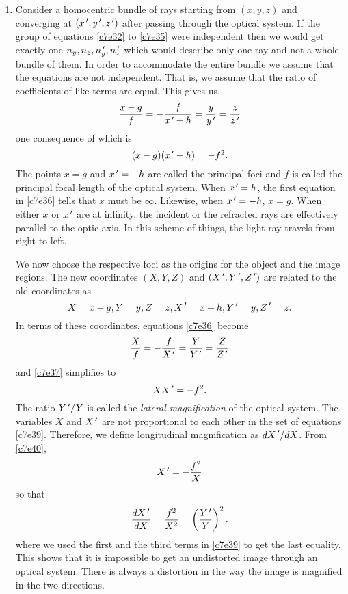 \begin{enumerate}
\item Consider a homocentric bundle of rays starting from $(x, y, z)$ and
converging at $(x^{\,\prime}, y^{\,\prime}, z^{\,\prime})$ after passing through the optical system.
If the group of equations \eqref{c7e32} to \eqref{c7e35} were independent then
we would get exactly one $n_y, n_z, n_y^{\,\prime}, n_z^{\,\prime}$ which would describe only
one ray and not a whole bundle of them. In order to accommodate the entire
bundle we assume that the equations are not independent. That is, we assume that
the ratio of coefficients of like terms are equal. This gives us,
\begin{equation}\label{c7e36}
\frac{x - g}{f} = -\frac{f}{x^{\,\prime} + h} = \frac{y}{y^{\,\prime}} = \frac{z}{z^{\,\prime}}
\end{equation}
one consequence of which is
\begin{equation}\label{c7e37}
(x - g)(x^{\,\prime} + h) = -f^2.
\end{equation}
The points $x = g$ and $x^{\,\prime} = -h$ are called the principal foci and $f$ is 
called the principal focal length of the optical system. When $x^{\,\prime} = h$, the 
first equation in \eqref{c7e36} tells that $x$ must be $\infty$. Likewise, when 
$x^{\,\prime} = -h$, $x = g$. When either $x$ or $x^{\,\prime}$ are at infinity, the incident 
or the refracted rays are effectively parallel to the optic axis. In this 
scheme of things, the light ray travels from right to left.

We now choose the respective foci as the origins for the object and the image 
regions. The new coordinates $(X, Y, Z)$ and $(X^{\,\prime}, Y^{\,\prime}, Z^{\,\prime})$ are related
to the old coordinates as
\begin{equation}\label{c7e38}
X = x - g, Y = y, Z = z, X^{\,\prime} = x + h, Y^{\,\prime} = y, Z^{\,\prime} = z.
\end{equation}
In terms of these coordinates, equations \eqref{c7e36} become
\begin{equation}\label{c7e39}
\frac{X}{f} = -\frac{f}{X^{\,\prime}} = \frac{Y}{Y^{\,\prime}} = \frac{Z}{Z^{\,\prime}}
\end{equation}
and \eqref{c7e37} simplifies to
\begin{equation}\label{c7e40}
XX^{\,\prime} = -f^2.
\end{equation}
The ratio $Y^{\,\prime}/Y$ is called the \emph{lateral magnification} of the optical
system. The variables $X$ and $X^{\,\prime}$ are not proportional to each other in
the set of equations \eqref{c7e39}. Therefore, we define longitudinal 
magnification as $dX^{\,\prime}/dX$. From \eqref{c7e40},
\[
X^{\,\prime} = -\frac{f^2}{X}
\]
so that
\begin{equation}\label{c7e41}
\frac{d{X^{\,\prime}}}{d{X}} = \frac{f^2}{X^2} = \left(\frac{Y^{\,\prime}}{Y}\right)^2.
\end{equation}
where we used the first and the third terms in \eqref{c7e39} to get the last
equality. This shows that it is impossible to get an undistorted image through
an optical system. There is always a distortion in the way the image is 
magnified in the two directions.
\end{enumerate}
